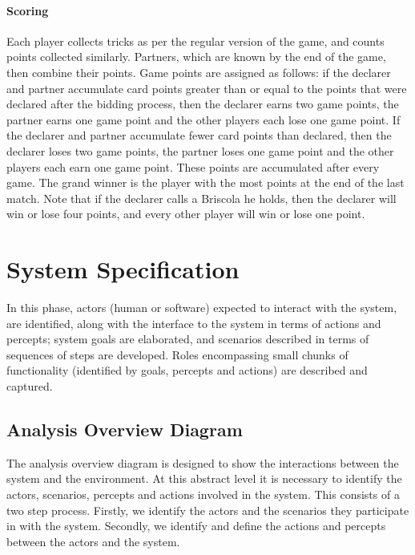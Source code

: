 \documentclass[a4paper]{article}
\begin{document}
\paragraph{Scoring}

Each player collects tricks as per the regular version of the game, and counts points collected similarly. Partners, which are known by the end of the game, then combine their points. Game points are assigned as follows: if the declarer and partner accumulate card points greater than or equal to the points that were declared after the bidding process, then the declarer earns two game points, the partner earns one game point and the other players each lose one game point. If the declarer and partner accumulate fewer card points than declared, then  the declarer loses two game points, the partner loses one game point and the other players each earn one game point. These points are accumulated after every game. The grand winner is the player with the most points at the end of the last match. Note that if the declarer calls a Briscola he holds, then the declarer will win or lose four points, and every other player will win or lose one point.

\section{System Specification}\label{sec:sysspec} 

In this phase, actors (human or software) expected to interact with the system, are identified, along with the interface to the system in terms of actions and percepts; system goals are elaborated, and scenarios described in terms of sequences of steps are developed. Roles encompassing small chunks of functionality (identified by goals, percepts and actions) are described and captured.

\subsection{Analysis Overview Diagram}

The analysis overview diagram is designed to show the interactions between the system and the environment. At this abstract level it is necessary to identify the actors, scenarios, percepts and actions involved in the system. This consists of a two step process. Firstly, we identify the actors and the scenarios they participate in with the system. Secondly, we identify and define the actions and percepts between the actors and the system.
\end{document}
